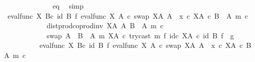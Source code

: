 \begin{isabellebody}
\ \ \ \ \ \ \ \ \ \ \ \ \isamarkupfalse%
\ eq\ \isamarkupfalse%
\ simp\isanewline
\ \ \ \ \ \ \ \ \ \ \isamarkupfalse%
\ \isamarkupfalse%
\ {\isachardoublequoteopen}{\isacharparenleft}{\kern0pt}eval{\isacharunderscore}{\kern0pt}func\ X\ B{\isacharparenright}{\kern0pt}{\isasymcirc}\isactrlsub c\ {\isacharparenleft}{\kern0pt}id\ B\ {\isasymtimes}\isactrlsub f\ {\isacharparenleft}{\kern0pt}{\isacharparenleft}{\kern0pt}{\isacharparenleft}{\kern0pt}eval{\isacharunderscore}{\kern0pt}func\ X\ A\ {\isasymcirc}\isactrlsub c\ swap\ {\isacharparenleft}{\kern0pt}X\isactrlbsup A\isactrlesup {\isacharparenright}{\kern0pt}\ A{\isacharparenright}{\kern0pt}\ {\isasymamalg}\ {\isacharparenleft}{\kern0pt}x\ {\isasymcirc}\isactrlsub c\ {\isasymbeta}\isactrlbsub X\isactrlbsup A\isactrlesup \ {\isasymtimes}\isactrlsub c\ {\isacharparenleft}{\kern0pt}B\ {\isasymsetminus}\ {\isacharparenleft}{\kern0pt}A{\isacharcomma}{\kern0pt}\ m{\isacharparenright}{\kern0pt}{\isacharparenright}{\kern0pt}\isactrlesub {\isacharparenright}{\kern0pt}\ {\isasymcirc}\isactrlsub c\isanewline
\ \ \ \ \ \ \ \ \ \ \ \ dist{\isacharunderscore}{\kern0pt}prod{\isacharunderscore}{\kern0pt}coprod{\isacharunderscore}{\kern0pt}inv\ {\isacharparenleft}{\kern0pt}X\isactrlbsup A\isactrlesup {\isacharparenright}{\kern0pt}\ A\ {\isacharparenleft}{\kern0pt}B\ {\isasymsetminus}\ {\isacharparenleft}{\kern0pt}A{\isacharcomma}{\kern0pt}\ m{\isacharparenright}{\kern0pt}{\isacharparenright}{\kern0pt}\ {\isasymcirc}\isactrlsub c\isanewline
\ \ \ \ \ \ \ \ \ \ \ \ swap\ {\isacharparenleft}{\kern0pt}A\ {\isasymCoprod}\ {\isacharparenleft}{\kern0pt}B\ {\isasymsetminus}\ {\isacharparenleft}{\kern0pt}A{\isacharcomma}{\kern0pt}\ m{\isacharparenright}{\kern0pt}{\isacharparenright}{\kern0pt}{\isacharparenright}{\kern0pt}\ {\isacharparenleft}{\kern0pt}X\isactrlbsup A\isactrlesup {\isacharparenright}{\kern0pt}\ {\isasymcirc}\isactrlsub c\ try{\isacharunderscore}{\kern0pt}cast\ m\ {\isasymtimes}\isactrlsub f\ id\isactrlsub c\ {\isacharparenleft}{\kern0pt}X\isactrlbsup A\isactrlesup {\isacharparenright}{\kern0pt}{\isacharparenright}{\kern0pt}\isactrlsup {\isasymsharp}{\isacharparenright}{\kern0pt}{\isacharparenright}{\kern0pt}\ {\isasymcirc}\isactrlsub c\ {\isacharparenleft}{\kern0pt}id\ B\ {\isasymtimes}\isactrlsub f\ \ g{\isacharparenright}{\kern0pt}\ {\isacharequal}{\kern0pt}\ \isanewline
\ \ \ \ \ \ \ \ \ \ {\isacharparenleft}{\kern0pt}eval{\isacharunderscore}{\kern0pt}func\ X\ B{\isacharparenright}{\kern0pt}{\isasymcirc}\isactrlsub c\ {\isacharparenleft}{\kern0pt}id\ B\ {\isasymtimes}\isactrlsub f\ {\isacharparenleft}{\kern0pt}{\isacharparenleft}{\kern0pt}{\isacharparenleft}{\kern0pt}eval{\isacharunderscore}{\kern0pt}func\ X\ A\ {\isasymcirc}\isactrlsub c\ swap\ {\isacharparenleft}{\kern0pt}X\isactrlbsup A\isactrlesup {\isacharparenright}{\kern0pt}\ A{\isacharparenright}{\kern0pt}\ {\isasymamalg}\ {\isacharparenleft}{\kern0pt}x\ {\isasymcirc}\isactrlsub c\ {\isasymbeta}\isactrlbsub X\isactrlbsup A\isactrlesup \ {\isasymtimes}\isactrlsub c\ {\isacharparenleft}{\kern0pt}B\ {\isasymsetminus}\ {\isacharparenleft}{\kern0pt}A{\isacharcomma}{\kern0pt}\ m{\isacharparenright}{\kern0pt}{\isacharparenright}{\kern0pt}\isactrlesub {\isacharparenright}{\kern0pt}\ {\isasymcirc}\isactrlsub c\isanewline

\end{isabellebody}

